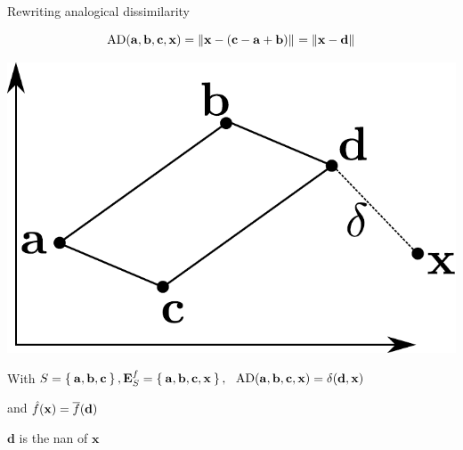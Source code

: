 \documentclass{beamer}
\begin{document}
\begin{frame}{Rewriting analogical dissimilarity}

$$\text{AD}(\mathbf{a},\mathbf{b},\mathbf{c},\mathbf{x})={\left\lVert\mathbf{x} -
(\mathbf{c}-\mathbf{a}+\mathbf{b})\right\rVert}_{}={\left\lVert\mathbf{x} - \mathbf{d}\right\rVert}_{}$$
\begin{center}
  \includegraphics[width=.3\textwidth]{figures/analogical_dissimilarity_pres.pdf}
\end{center}

  With $S = \Set{\mathbf{a}, \mathbf{b}, \mathbf{c}}, \mathbf{E}_{S}^{f} = \Set{\mathbf{a},
  \mathbf{b}, \mathbf{c}, \mathbf{x}}, ~~ \text{AD}(\mathbf{a}, \mathbf{b},
  \mathbf{c}, \mathbf{x}) = \delta(\mathbf{d}, \mathbf{x})$

  and $\hat{f}(\mathbf{x}) = \overline{f}(\mathbf{d})$

  $\mathbf{d}$ is the \alert{nan} of $\mathbf{x}$
\end{frame}
\end{document}

